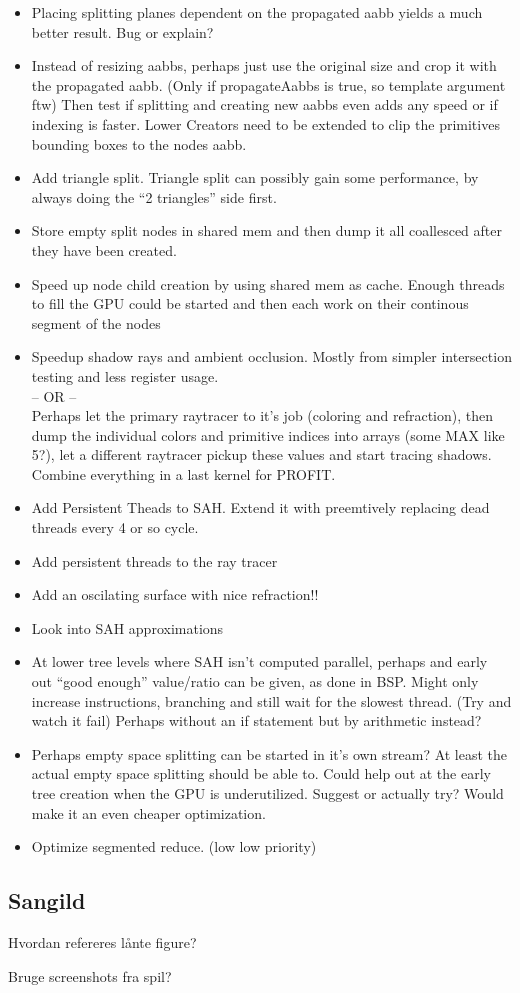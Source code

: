 \begin{itemize}
\item Placing splitting planes dependent on the propagated aabb yields
  a much better result. Bug or explain? 
\item Instead of resizing aabbs, perhaps just use the original size
  and crop it with the propagated aabb. (Only if propagateAabbs is
  true, so template argument ftw) Then test if splitting and creating
  new aabbs even adds any speed or if indexing is faster. Lower
  Creators need to be extended to clip the primitives bounding boxes
  to the nodes aabb.
\item Add triangle split. Triangle split can possibly gain
  some performance, by always doing the ``2 triangles'' side first.
\item Store empty split nodes in shared mem and then dump it all
  coallesced after they have been created.
\item Speed up node child creation by using shared mem as
  cache. Enough threads to fill the GPU could be started and then each
  work on their continous segment of the nodes
\item Speedup shadow rays and ambient occlusion. Mostly from simpler
  intersection testing and less register usage.\\ -- OR -- \\ Perhaps
  let the primary raytracer to it's job (coloring and refraction),
  then dump the individual colors and primitive indices into arrays
  (some MAX like 5?), let a different raytracer pickup these values
  and start tracing shadows. Combine everything in a last kernel for
  PROFIT.
\item Add Persistent Theads to SAH. Extend it with preemtively
  replacing dead threads every 4 or so cycle.
\item Add persistent threads to the ray tracer
\item Add an oscilating surface with nice refraction!!
\item Look into SAH approximations
\item At lower tree levels where SAH isn't computed parallel, perhaps
  and early out ``good enough'' value/ratio can be given, as done in
  BSP. Might only increase instructions, branching and still wait for
  the slowest thread. (Try and watch it fail) Perhaps without an if
  statement but by arithmetic instead?
\item Perhaps empty space splitting can be started in it's own stream?
  At least the actual empty space splitting should be able to. Could
  help out at the early tree creation when the GPU is
  underutilized. Suggest or actually try? Would make it an even
  cheaper optimization.
\item Optimize segmented reduce. (low low priority)
\end{itemize}




\subsection*{Sangild}

Hvordan refereres lånte figure?

Bruge screenshots fra spil?
